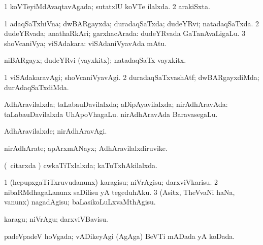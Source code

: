 \bentry
{} 
\gl{\gu}
\expl{}
\bmng
\bnum
\num{1} koVTeyiMdAvaqtavAgada; sutatxlU koVTe ilalxda. 
\num{2} arakiSxta. 
\enum
\emng
\eentry

\bentry
{} 
\gl{\gu}
\expl{}
\bmng
\bnum
\num{1} adaqSaTxhiVna; dwBARgayxda; duradaqSaTxda; dudeYRvi; natadaqSaTxda. 
\num{2} dudeYRvada; anathaRkAri; garxhacArada:  dudeYRvada GaTanAvaLigaLu. 
\num{3} shoVcaniVya; viSAdakara:  viSAdaniVyavAda mAtu. 
\enum
\emng
\eentry

\bentry
{} 
\gl{\nA}
\expl{}
\bmng
 niBARgayx; dudeYRvi (vayxkitx); natadaqSaTx vayxkitx. 
\emng
\eentry

\bentry
{} 
\gl{\kirxvi}
\expl{}
\bmng
\bnum
\num{1} viSAdakaravAgi; shoVcaniVyavAgi. 
\num{2} duradaqSaTxvashAtf; dwBARgayxdiMda; durAdaqSaTxdiMda. 
\enum
\emng
\eentry

\bentry
{} 
\gl{\gu}
\expl{}
\bmng
AdhAravilalxda; taLabauDavilalxda; aDipAyavilalxda; nirAdhAravAda:  taLabauDavilalxda UhApoVhagaLu.  nirAdhAravAda BaravasegaLu. 
\emng
\eentry

\bentry
{} 
\gl{\kirxvi}
\expl{}
\bmng
 AdhAravilalxde; nirAdhAravAgi.\eng{} 
\emng
\eentry

\bentry
{} 
\gl{\nA}
\expl{}
\bmng
nirAdhArate; apArxmANayx; AdhAravilalxdiruvike. 
\emng
\eentry

\bentry
{} 
\gl{\gu}
\expl{}
\bmng
 (\kanmu\ citarxda \vi) cwkaTiTxlalxda; kaTuTxhAkilalxda.\eng{ } 
\emng
\eentry

\bentry
{} 
\gl{\kirx}


\noindent
\gl{\sakirx}
\expl{}
\bmng
\bnum
\num{1} (hepupxgaTiTxruvudanunx) karagisu; niVrAgisu; darxviVkarisu. 
\num{2} nibaRMdhagaLanunx saDilisu yA tegeduhAku. 
\num{3} (Asitx, TheVvaNi haNa, \mo vanunx) nagadAgisu; baLasikoLuLxvaMthAgisu. 
\enum
\emng

\noindent 
\gl{\akirx}
\expl{}
\bmng
karagu; niVrAgu; darxviVBavisu. 
\emng
\eentry

\bentry
{} 
\gl{\gu}
\expl{}
\bmng
padeVpadeV hoVgada; vADikeyAgi (AgAga) BeVTi mADada yA koDada. 
\emng
\eentry

